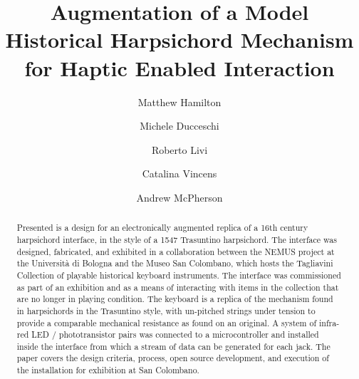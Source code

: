 \documentclass[sigconf]{nimeart}
\begin{document}
\title{Augmentation of a Model Historical Harpsichord Mechanism for Haptic Enabled Interaction}

\author{Matthew Hamilton}
\author{Michele Ducceschi}

\author{Roberto Livi}
\author{Catalina Vincens}

\author{Andrew McPherson}

\renewcommand{\shortauthors}{Trovato et al.}

\begin{abstract}
Presented is a design for an electronically augmented replica of a 16th century
harpsichord interface, in the style of a 1547 Trasuntino harpsichord. The
interface was designed, fabricated, and exhibited in a collaboration between the
NEMUS project at the Università di Bologna and the Museo San Colombano, which
hosts the Tagliavini Collection of playable historical keyboard instruments. The
interface was commissioned as part of an exhibition and as a means of
interacting with items in the collection that are no longer in playing
condition. The keyboard is a replica of the mechanism found in harpsichords in
the Trasuntino style, with un-pitched strings under tension to provide a
comparable mechanical resistance as found on an original. A system of infra-red
LED / phototransistor pairs was connected to a microcontroller and installed
inside the interface from which a stream of data can be generated for each jack.
The paper covers the design criteria, process, open source development, and
execution of the installation for exhibition at San Colombano.
\end{abstract}
\end{document}

